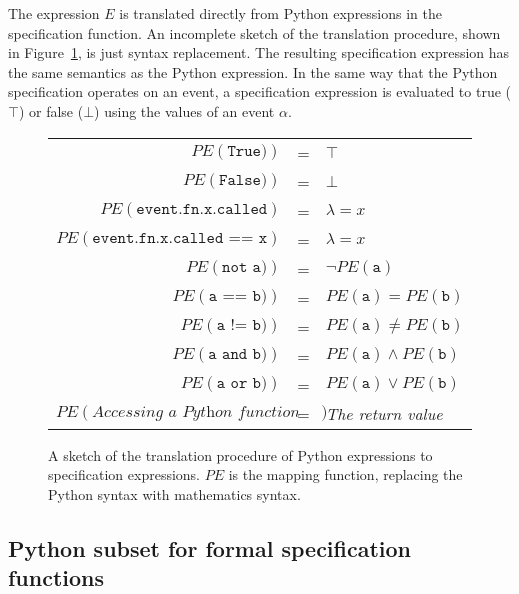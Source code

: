 \documentclass[a4paper,11pt]{kth-mag}
\begin{document}
The expression $E$ is translated directly from Python expressions in the
specification function. An incomplete sketch of the translation procedure,
shown in Figure~\ref{figure-semantics-translation}, is just syntax replacement.
The resulting specification expression has the same semantics as the Python
expression. In the same way that the Python specification operates on an event,
a specification expression is evaluated to true ($\top$) or false ($\bot$)
using the values of an event $\alpha$.

\begin{figure}[h!]
	\begin{minipage}{0.9\textwidth}
		\centering
    \begin{tabular}{r c l}
      $PE(\texttt{True)})$ & = & $\top$ \\
      $PE(\texttt{False)})$ & = & $\bot$ \\
      $PE(\texttt{event.fn.x.called})$ & = & $\lambda = x$ \\
      $PE(\texttt{event.fn.x.called == x})$ & = & $\lambda = x$ \\
      $PE(\texttt{not a)})$ & = & $\neg PE(\texttt{a})$ \\
      $PE(\texttt{a == b)})$ & = & $PE(\texttt{a}) = PE(\texttt{b})$ \\
      $PE(\texttt{a != b)})$ & = & $PE(\texttt{a}) \neq PE(\texttt{b})$ \\
      $PE(\texttt{a and b)})$ & = & $PE(\texttt{a}) \wedge PE(\texttt{b})$ \\
      $PE(\texttt{a or b)})$ & = & $PE(\texttt{a}) \vee PE(\texttt{b})$ \\
      $PE(\textit{Accessing a Python function or property})$ & = & \textit{The return value} \\
    \end{tabular}
  \end{minipage}
  \caption{A sketch of the translation procedure of Python expressions to
    specification expressions. $PE$ is the mapping function, replacing the
    Python syntax with mathematics syntax.}
  \label{figure-semantics-translation}
\end{figure}


\subsection{Python subset for formal specification functions}
\label{section-approach-python-subset}
\lstset{language=Python,numbers=left}
\end{document}
